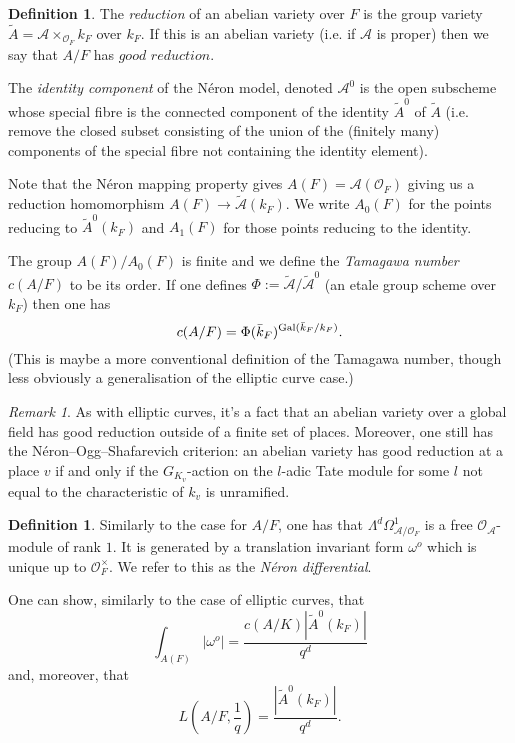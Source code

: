 \documentclass[12pt]{amsart}
\numberwithin{equation}{section}
\theoremstyle{remark}
\newtheorem{remark}[equation]{Remark}
\theoremstyle{definition}
\theoremstyle{definition}
\theoremstyle{definition}
\newtheorem{defi}[equation]{Definition}
\theoremstyle{definition}
\theoremstyle{definition}
\theoremstyle{definition}
\theoremstyle{definition}
\begin{document}
\begin{defi}
The \textit{reduction} of an abelian variety over $F$ is the group variety $\tilde{A}=\mathcal{A}\times_{\mathcal{O}_F}k_F$ over $k_F$. If this is an abelian variety (i.e. if $\mathcal{A}$ is proper) then we say that $A/F$ has $\textit{good reduction}$. 

The \textit{identity component} of the N\'{e}ron model, denoted $\mathcal{A}^0$ is the open subscheme whose special fibre is the connected component of the identity $\tilde{A}^0$ of $\tilde{A}$ (i.e. remove the closed subset consisting of the union of the (finitely many) components of the special fibre not containing the identity element).   

Note that the N\'{e}ron mapping property gives $A(F)=\mathcal{A}(\mathcal{O}_F)$ giving us a reduction homomorphism $A(F)\rightarrow \tilde{\mathcal{A}}(k_F)$. We write $A_0(F)$ for the points reducing to $\tilde{A}^0(k_F)$ and $A_1(F)$ for those points reducing to the identity.  

The group $A(F)/A_0(F)$ is finite and we define the \textit{Tamagawa number} $c(A/F)$ to be its order. If one defines $\Phi:=\tilde{\mathcal{A}}/\tilde{\mathcal{A}}^0$ (an etale group scheme over $k_F$) then one has
\[c(A/F)=\Phi(\bar{k}_F)^{\textup{Gal}(\bar{k}_F/k_F)}.\] 
(This is maybe a more conventional definition of the Tamagawa number, though less obviously a generalisation of the elliptic curve case.)
\end{defi}

\begin{remark}
As with  elliptic curves, it's a fact that an abelian variety over a global field has good reduction outside of a finite set of places. Moreover, one still has the N\'{e}ron--Ogg--Shafarevich criterion: an abelian variety has good reduction at a place $v$ if and only if the $G_{K_v}$-action on the $l$-adic Tate module for some $l$ not equal to the characteristic of $k_v$ is unramified.  
\end{remark}

\begin{defi}
Similarly to the case for $A/F$, one has that $\Lambda^d\Omega^1_{\mathcal{A}/\mathcal{O}_F}$ is a free $\mathcal{O}_\mathcal{A}$-module of rank $1$. It is generated by a translation invariant form $\omega^o$ which is unique up to $\mathcal{O}_F^{\times}$. We refer to this as the \textit{N\'{e}ron differential}.
\end{defi}

One can  show, similarly to the case of elliptic curves, that 
\[\int_{A(F)}|\omega^o|=\frac{c(A/K)|\tilde{A}^0(k_F)|}{q^d}\]
and, moreover, that 
\[L(A/F,\frac{1}{q})=\frac{|\tilde{A}^0(k_F)|}{q^d}.\]
\end{document}
